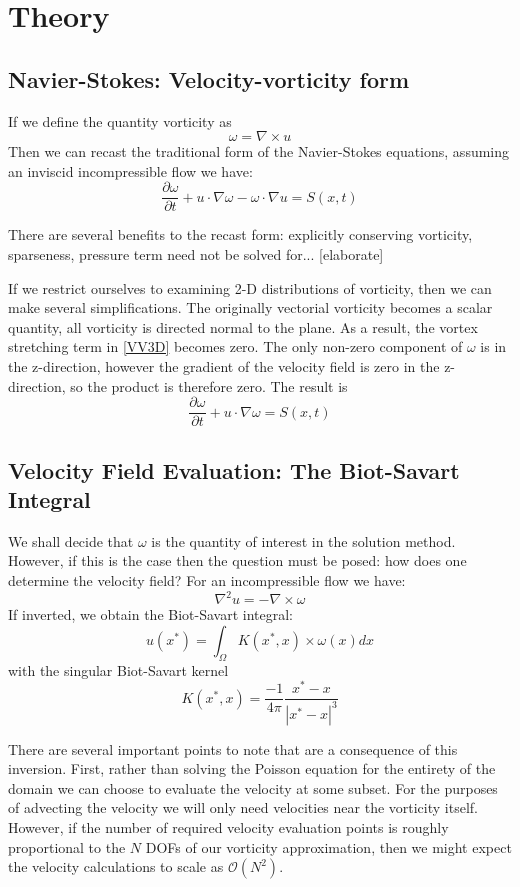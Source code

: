 \documentclass[letterpaper,12pt]{report}
\newcommand{\be}{\begin{equation}}
\newcommand{\ben}[1]{\begin{equation}\label{#1}}
\newcommand{\ee}{\end{equation}}
\begin{document}
\chapter{Theory}
\section{Navier-Stokes: Velocity-vorticity form}
If we define the quantity vorticity as
\be \omega = \nabla \times u \ee
Then we can recast the traditional form of the Navier-Stokes equations, assuming an inviscid incompressible flow we have:
\ben{VV3D} \frac{\partial \omega}{\partial t} + u \cdot \nabla \omega - \omega \cdot \nabla u = S(x,t)\ee

There are several benefits to the recast form: explicitly conserving vorticity, sparseness, pressure term need not be solved for... [elaborate]

If we restrict ourselves to examining 2-D distributions of vorticity, then we can make several simplifications. The originally vectorial vorticity becomes a scalar quantity, all vorticity is directed normal to the plane. As a result, the vortex stretching term in \eqref{VV3D} becomes zero. The only non-zero component of $\omega$ is in the z-direction, however the gradient of the velocity field is zero in the z-direction, so the product is therefore zero. The result is
\ben{VV2D} \frac{\partial \omega}{\partial t} + u \cdot \nabla \omega = S(x,t)\ee

\section{Velocity Field Evaluation: The Biot-Savart Integral}
We shall decide that $\omega$ is the quantity of interest in the solution method. However, if this is the case then the question must be posed: how does one determine the velocity field? For an incompressible flow we have:
\be \nabla^2 u = -\nabla \times \omega \ee
If inverted, we obtain the Biot-Savart integral:
\ben{BS} u(x^*) = \int_\Omega K(x^*,x) \times \omega(x) dx \ee
with the singular Biot-Savart kernel
\ben{BSkern} K(x^*,x) = \frac{-1}{4 \pi} \frac{x^*-x}{|x^*-x|^3} \ee

There are several important points to note that are a consequence of this inversion. First, rather than solving the Poisson equation for the entirety of the domain we can choose to evaluate the velocity at some subset. For the purposes of advecting the velocity we will only need velocities near the vorticity itself. However, if the number of required velocity evaluation points is roughly proportional to the $N$ DOFs of our vorticity approximation, then we might expect the velocity calculations to scale as $\mathcal{O}(N^2)$.
\end{document}
